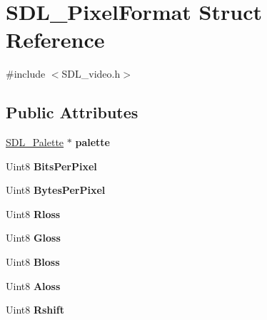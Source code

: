 \hypertarget{structSDL__PixelFormat}{\section{S\+D\+L\+\_\+\+Pixel\+Format Struct Reference}
\label{structSDL__PixelFormat}
}


{\ttfamily \#include $<$S\+D\+L\+\_\+video.\+h$>$}

\subsection*{Public Attributes}
\begin{DoxyCompactItemize}
\item 
\hypertarget{structSDL__PixelFormat_a6fae4a385741ac5b45c5141c288e4f5c}{\hyperlink{structSDL__Palette}{S\+D\+L\+\_\+\+Palette} $\ast$ {\bfseries palette}}\label{structSDL__PixelFormat_a6fae4a385741ac5b45c5141c288e4f5c}

\item 
\hypertarget{structSDL__PixelFormat_aac533fae3043ef44df01108248e111d8}{Uint8 {\bfseries Bits\+Per\+Pixel}}\label{structSDL__PixelFormat_aac533fae3043ef44df01108248e111d8}

\item 
\hypertarget{structSDL__PixelFormat_a6fec9e1809cc3da458d58b8cccd058f2}{Uint8 {\bfseries Bytes\+Per\+Pixel}}\label{structSDL__PixelFormat_a6fec9e1809cc3da458d58b8cccd058f2}

\item 
\hypertarget{structSDL__PixelFormat_a9994b4ed87a2551253aebfa191db8424}{Uint8 {\bfseries Rloss}}\label{structSDL__PixelFormat_a9994b4ed87a2551253aebfa191db8424}

\item 
\hypertarget{structSDL__PixelFormat_a94469768d8436e631a13d68623ff663f}{Uint8 {\bfseries Gloss}}\label{structSDL__PixelFormat_a94469768d8436e631a13d68623ff663f}

\item 
\hypertarget{structSDL__PixelFormat_a337072c1bc8b41efdd2da4e95b8c2ff7}{Uint8 {\bfseries Bloss}}\label{structSDL__PixelFormat_a337072c1bc8b41efdd2da4e95b8c2ff7}

\item 
\hypertarget{structSDL__PixelFormat_a660e95097874088292f1289a458efaa2}{Uint8 {\bfseries Aloss}}\label{structSDL__PixelFormat_a660e95097874088292f1289a458efaa2}

\item 
\hypertarget{structSDL__PixelFormat_abfdec7b9ee2ee39db630f4022e4e0daa}{Uint8 {\bfseries Rshift}}\label{structSDL__PixelFormat_abfdec7b9ee2ee39db630f4022e4e0daa}


\end{DoxyCompactItemize}
